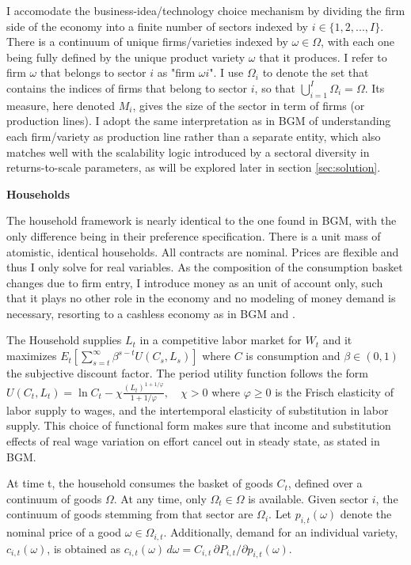 \documentclass[a4paper,12pt]{article} %
\numberwithin{equation}{section} %
\numberwithin{figure}{section}
\numberwithin{table}{section}
\begin{document}
I accomodate the business-idea/technology choice mechanism by dividing the firm side of the economy into a finite number of sectors indexed by
$i \in \{1,2,...,I\}$. There is a continuum of unique firms/varieties indexed by $\omega \in \Omega$, with each one being fully defined by 
the unique product variety $\omega$ that it produces. I refer to firm $\omega$ that belongs to sector $i$ as "firm $\omega i$". 
I use $\Omega_i$ to denote the set that contains the indices of firms that belong to sector $i$, so that $\bigcup_{i=1}^{I} \Omega_i = \Omega$. 
Its measure, here denoted $M_{i}$, gives the size of the sector in term of firms (or production lines). I adopt the same interpretation as in BGM 
of understanding each firm/variety as production line rather than a separate entity, which also matches well with the scalability logic introduced
by a sectoral diversity in returns-to-scale parameters, as will be explored later in section \ref{sec:solution}.

\medskip
\medskip
\noindent\textbf{Households}
\medskip

The household framework is nearly identical to the one found in BGM, with the only difference being in their preference specification. There is a 
unit mass of atomistic, identical households. All contracts are nominal. Prices are flexible and thus I only solve for real variables. As the
composition of the consumption basket changes due to firm entry, I introduce money as an unit of account only, such that it plays no other role in the
economy and no modeling of money demand is necessary, resorting to a cashless economy as in BGM and \textcite{woodford2003interest}.

The Household supplies $L_t$ in a competitive labor market for $W_t$ and it maximizes $E_t \left[ \sum_{s=t}^{\infty} \beta^{s - t} U(C_s, L_s) \right]$ 
where $C$ is consumption and $\beta \in (0,1)$ the subjective discount factor. The period utility function follows the form 
$U(C_t, L_t) = \ln C_t - \chi \frac{(L_t)^{1 + 1/\varphi}}{1 + 1/\varphi}, \quad \chi > 0$ where $\varphi \geq 0$ is the Frisch elasticity
of labor supply to wages, and the intertemporal elasticity of substitution in labor supply. This choice of functional form makes sure that 
income and substitution effects of real wage variation on effort cancel out in steady state, as stated in BGM.

At time t, the household consumes the basket of goods $C_t$, defined over a continuum of goods $\Omega$. At any time, only $\Omega_t \in \Omega$ 
is available. Given sector $i$, the continuum of goods stemming from that sector are $\Omega_{i}$. Let $p_{i,t}(\omega)$ denote the nominal price 
of a good $\omega \in \Omega_{i,t}$. Additionally, demand for an individual variety, $c_{i,t}(\omega)$, is obtained as 
$c_{i,t}(\omega) \, d\omega = C_{i,t} \, \partial P_{i,t} / \partial p_{i,t}(\omega)$.
\end{document}
